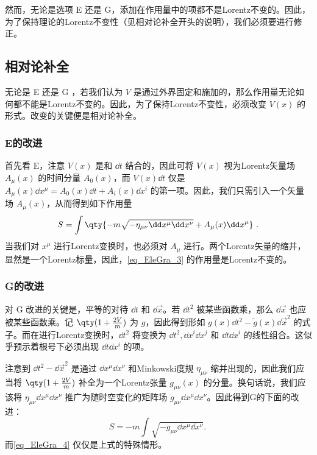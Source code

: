 然而，无论是选项 E 还是 G，添加在作用量中的项都不是Lorentz不变的。因此，为了保持理论的Lorentz不变性（见相对论补全开头的说明），我们必须要进行修正。

\subsection{相对论补全}
无论是 E 还是 G ，若我们认为 $V$ 是通过外界固定和施加的，那么作用量无论如何都不能是Lorentz不变的。因此，为了保持Lorentz不变性，必须改变 $V(x)$ 的形式。改变的关键便是相对论补全。
\subsubsection{E的改进}

首先看 E，注意 $V(x)$ 是和 $\dd t$ 结合的，因此可将 $V(x)$ 视为Lorentz矢量场 $A_\mu(x)$ 的时间分量 $A_0(x)$，而 $V(x)\dd t$ 仅是 $A_\mu(x)\dd x^\mu=A_0(x)\dd t+A_i(x)\dd x^i$ 的第一项。因此，我们只需引入一个矢量场 $A_\mu(x)$，从而得到如下作用量
\begin{equation}\label{eq_EleGra_3}
S=\int\qty{-m\sqrt{-\eta_{\mu\nu}\dd x^\mu\dd x^\nu}+A_\mu(x)\dd x^\mu}~.
\end{equation}
当我们对 $x^\mu$ 进行Lorentz变换时，也必须对 $A_\mu$ 进行。两个Lorentz矢量的缩并，显然是一个Lorentz标量，因此，\autoref{eq_EleGra_3} 的作用量是Lorentz不变的。

\subsubsection{G的改进}
对 G 改进的关键是，平等的对待 $\dd t$ 和 $\dd{\vec x}$。若 $\dd t^2$ 被某些函数乘，那么 $\dd{\vec x}$ 也应被某些函数乘。记 $\qty(1+\frac{2V}{m})$ 为 $g$，因此得到形如 $g(x)\dd t^2-\tilde g(x)\dd{\vec x}^2$ 的式子。而在进行Lorentz变换时，$\dd t^2$ 将变换为 $\dd t^2,\dd x^i\dd x^j$ 和 $\dd t\dd x^i$ 的线性组合。这似乎预示着根号下必须出现 $\dd t\dd x^i$ 的项。

注意到 $\dd t^2-\dd{\vec x}^2$ 是通过 $\dd x^\mu\dd x^\nu$ 和Minkowski度规 $\eta_{\mu\nu}$ 缩并出现的，因此我们应当将 $\qty(1+\frac{2V}{m})$ 补全为一个Lorentz张量 $g_{\mu\nu}(x)$ 的分量。换句话说，我们应该将 $\eta_{\mu\nu}\dd x^\mu\dd x^\nu$ 推广为随时空变化的矩阵场 $g_{\mu\nu}\dd x^\mu\dd x^\nu$。因此得到G的下面的改进：
\begin{equation}
S=-m\int\sqrt{-g_{\mu\nu}\dd x^\mu\dd x^\nu}.~
\end{equation}
而\autoref{eq_EleGra_4} 仅仅是上式的特殊情形。

